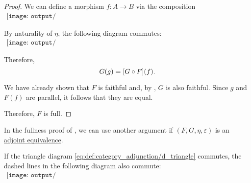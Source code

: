 \begin{proof}
  We can define a morphism \( f: A \to B \) via the composition
  \begin{equation}\label{eq:thm:equivalence_induces_fully_faithful_and_essentially_surjective_functor/fullness/def}
    \begin{aligned}
      \texttt{[image: output/thm\_\_equivalence\_induces\_fully\_faithful\_and\_essentially\_surjective\_functor]}
    \end{aligned}
  \end{equation}

  By naturality of \( \eta \), the following diagram commutes:
  \begin{equation}\label{eq:thm:equivalence_induces_fully_faithful_and_essentially_surjective_functor/fullness/eta_nat}
    \begin{aligned}
      \texttt{[image: output/thm\_\_equivalence\_induces\_fully\_faithful\_and\_essentially\_surjective\_functor]}
    \end{aligned}
  \end{equation}

  Therefore,
  \begin{equation*}
     G(g) = [G \bincirc F](f).
  \end{equation*}

  We have already shown that \( F \) is faithful and, by , \( G \) is also faithful. Since \( g \) and \( F(f) \) are parallel, it follows that they are equal.

  Therefore, \( F \) is full.
\end{proof}

\begin{remark}\label{rem:adjoint_equivalence_induces_fully_faithful_and_essentially_surjective_functor}
  In the fullness proof of , we can use another argument if \( (F, G, \eta, \varepsilon) \) is an \hyperref[def:adjoint_equivalence]{adjoint equivalence}.

  If the triangle diagram \eqref{eq:def:category_adjunction/d_triangle} commutes, the dashed lines in the following diagram also commute:
  \begin{equation}\label{eq:thm:equivalence_induces_fully_faithful_and_essentially_surjective_functor/fullness/triangles}
    \begin{aligned}
      \texttt{[image: output/rem\_\_adjoint\_equivalence\_induces\_fully\_faithful\_and\_essentially\_surjective\_functor]}
    \end{aligned}
  \end{equation}
\end{remark}

